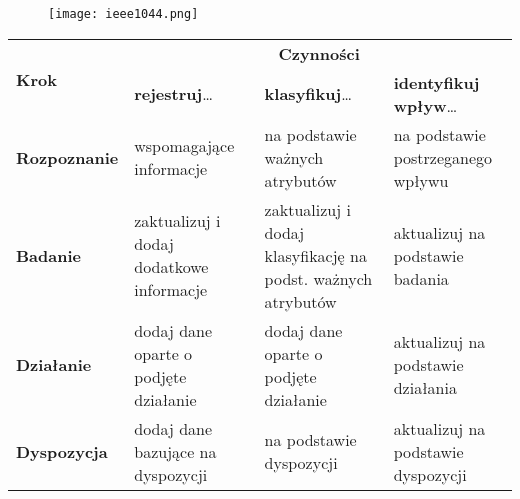 \documentclass[../main.tex]{subfiles}
\begin{document}
    \begin{figure}[H]
        \texttt{[image: ieee1044.png]}
    \end{figure}


    \begin{table}[H]
        \begin{center}
            \begin{tabular}{ | p{3cm} | p{3cm} | p{3cm} | p{3cm} |}
                \hline
                \multirow{2}{*}{\textbf{Krok}} & \multicolumn{3}{c|}{\textbf{Czynności}} \\
                \cline{2-4}
                \multirow{2}{*}{} & \textbf{rejestruj}\ldots & \textbf{klasyfikuj}\ldots & \textbf{identyfikuj wpływ}\ldots \\
                \hline
                \textbf{Rozpoznanie } & wspomagające informacje
                & na podstawie ważnych atrybutów
                & na podstawie postrzeganego wpływu \\
                \hline
                \textbf{Badanie}
                & zaktualizuj i dodaj dodatkowe informacje
                & zaktualizuj i dodaj klasyfikację na podst. ważnych atrybutów
                & aktualizuj na podstawie badania \\
                \hline
                \textbf{Działanie}
                & dodaj dane oparte o podjęte działanie
                & dodaj dane oparte o podjęte działanie
                & aktualizuj na podstawie działania \\
                \hline
                \textbf{Dyspozycja}
                & dodaj dane bazujące na dyspozycji
                & na podstawie dyspozycji
                & aktualizuj na podstawie dyspozycji \\
                \hline
            \end{tabular}
        \end{center}
    \end{table}
\end{document}
